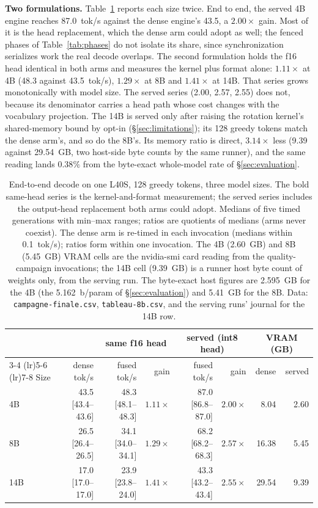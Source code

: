 \textbf{Two formulations.} Table~\ref{tab:e2e} reports each size twice.
End to end, the served 4B engine reaches 87.0~tok/s against the dense
engine's 43.5, a $2.00\times$ gain. Most of it is the head replacement,
which the dense arm could adopt as well; the fenced phases of
Table~\ref{tab:phases} do not isolate its share, since synchronization
serializes work the real decode overlaps. The second formulation holds the
f16 head identical in both arms and measures the kernel plus format alone:
$1.11\times$ at 4B (48.3 against 43.5~tok/s), $1.29\times$ at 8B and
$1.41\times$ at 14B. That series grows monotonically with model size. The
served series (2.00, 2.57, 2.55) does not, because its denominator carries
a head path whose cost changes with the vocabulary projection. The 14B
is served only after raising the rotation kernel's shared-memory bound by
opt-in (\S\ref{sec:limitations}); its 128 greedy tokens match the dense
arm's, and so do the 8B's. Its memory ratio is direct, $3.14\times$ less
(9.39 against 29.54~GB, two host-side byte counts by the same runner), and
the same reading lands $0.38\%$ from the byte-exact whole-model rate of
\S\ref{sec:evaluation}.

\begin{table}[t]
\centering
\footnotesize
\setlength{\tabcolsep}{4pt}
\begin{tabular}{lrrrrrrr}
\toprule
 & & \multicolumn{2}{c}{same f16 head} & \multicolumn{2}{c}{served (int8 head)} & \multicolumn{2}{c}{VRAM (GB)} \\
\cmidrule(lr){3-4} \cmidrule(lr){5-6} \cmidrule(lr){7-8}
Size & dense tok/s & fused tok/s & gain & fused tok/s & gain & dense & served \\
\midrule
4B  & 43.5 [43.4--43.6] & 48.3 [48.1--48.3] & $\mathbf{1.11\times}$ & 87.0 [86.8--87.0] & $2.00\times$ & 8.04  & 2.60 \\
8B  & 26.5 [26.4--26.5] & 34.1 [34.0--34.1] & $\mathbf{1.29\times}$ & 68.2 [68.2--68.3] & $2.57\times$ & 16.38 & 5.45 \\
14B & 17.0 [17.0--17.0] & 23.9 [23.8--24.0] & $\mathbf{1.41\times}$ & 43.3 [43.2--43.4] & $2.55\times$ & 29.54 & 9.39 \\
\bottomrule
\end{tabular}
\caption{End-to-end decode on one L40S, 128 greedy tokens, three model
sizes. The bold same-head series is the kernel-and-format measurement; the
served series includes the output-head replacement both arms could adopt.
Medians of five timed generations with min--max ranges; ratios are
quotients of medians (arms never coexist). The dense arm is re-timed in each
invocation (medians within 0.1~tok/s); ratios form within one invocation. The 4B (2.60~GB) and 8B (5.45~GB) VRAM
cells are the nvidia-smi card reading from the quality-campaign
invocations; the 14B cell (9.39~GB) is a runner host byte count of weights
only, from the serving run. The byte-exact host figures are 2.595~GB for
the 4B (the 5.162~b/param of \S\ref{sec:evaluation}) and 5.41~GB for the
8B. Data: \texttt{campagne-finale.csv}, \texttt{tableau-8b.csv}, and the
serving runs' journal for the 14B row.}
\label{tab:e2e}
\end{table}

